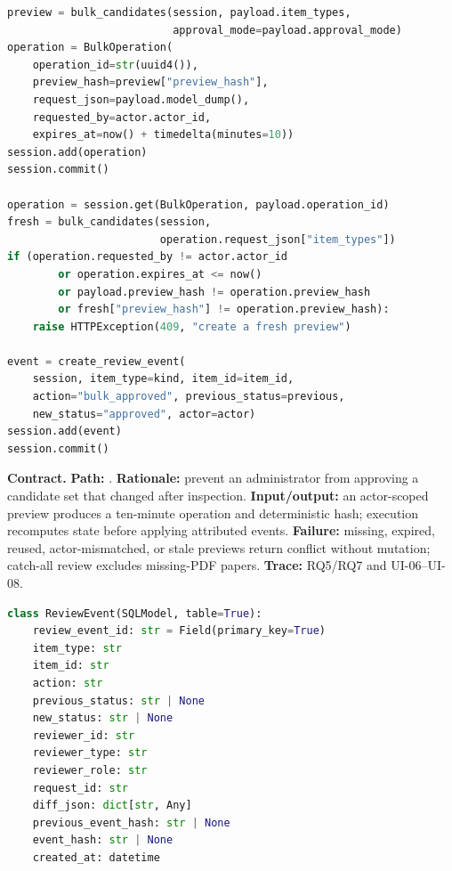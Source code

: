 \begin{lstlisting}[language=Python,basicstyle=\ttfamily\footnotesize,caption={Abridged actor-bound preview/execute transaction.}]
preview = bulk_candidates(session, payload.item_types,
                          approval_mode=payload.approval_mode)
operation = BulkOperation(
    operation_id=str(uuid4()),
    preview_hash=preview["preview_hash"],
    request_json=payload.model_dump(),
    requested_by=actor.actor_id,
    expires_at=now() + timedelta(minutes=10))
session.add(operation)
session.commit()

operation = session.get(BulkOperation, payload.operation_id)
fresh = bulk_candidates(session,
                        operation.request_json["item_types"])
if (operation.requested_by != actor.actor_id
        or operation.expires_at <= now()
        or payload.preview_hash != operation.preview_hash
        or fresh["preview_hash"] != operation.preview_hash):
    raise HTTPException(409, "create a fresh preview")

event = create_review_event(
    session, item_type=kind, item_id=item_id,
    action="bulk_approved", previous_status=previous,
    new_status="approved", actor=actor)
session.add(event)
session.commit()
\end{lstlisting}

\noindent\textbf{Contract.} \textbf{Path:} . \textbf{Rationale:} prevent an administrator from approving a candidate set that changed after inspection. \textbf{Input/output:} an actor-scoped preview produces a ten-minute operation and deterministic hash; execution recomputes state before applying attributed events. \textbf{Failure:} missing, expired, reused, actor-mismatched, or stale previews return conflict without mutation; catch-all review excludes missing-PDF papers. \textbf{Trace:} RQ5/RQ7 and UI-06--UI-08.

\begin{lstlisting}[language=Python,basicstyle=\ttfamily\footnotesize,caption={Abridged review-event schema.}]
class ReviewEvent(SQLModel, table=True):
    review_event_id: str = Field(primary_key=True)
    item_type: str
    item_id: str
    action: str
    previous_status: str | None
    new_status: str | None
    reviewer_id: str
    reviewer_type: str
    reviewer_role: str
    request_id: str
    diff_json: dict[str, Any]
    previous_event_hash: str | None
    event_hash: str | None
    created_at: datetime
\end{lstlisting}

